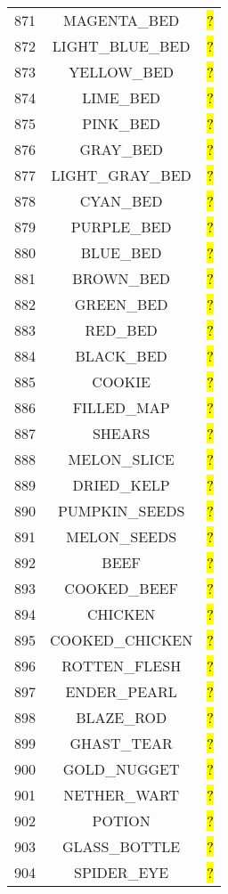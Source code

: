 \documentclass[11pt]{article}
\newcommand\myworries[1]{\sethlcolor{red}\hl{#1}}
\begin{document}
\begin{longtable}{ |c|c|c| }
871 & MAGENTA\_BED & \myworries{?} \\
872 & LIGHT\_BLUE\_BED & \myworries{?} \\
873 & YELLOW\_BED & \myworries{?} \\
874 & LIME\_BED & \myworries{?} \\
875 & PINK\_BED & \myworries{?} \\
876 & GRAY\_BED & \myworries{?} \\
877 & LIGHT\_GRAY\_BED & \myworries{?} \\
878 & CYAN\_BED & \myworries{?} \\
879 & PURPLE\_BED & \myworries{?} \\
880 & BLUE\_BED & \myworries{?} \\
881 & BROWN\_BED & \myworries{?} \\
882 & GREEN\_BED & \myworries{?} \\
883 & RED\_BED & \myworries{?} \\
884 & BLACK\_BED & \myworries{?} \\
885 & COOKIE & \myworries{?} \\
886 & FILLED\_MAP & \myworries{?} \\
887 & SHEARS & \myworries{?} \\
888 & MELON\_SLICE & \myworries{?} \\
889 & DRIED\_KELP & \myworries{?} \\
890 & PUMPKIN\_SEEDS & \myworries{?} \\
891 & MELON\_SEEDS & \myworries{?} \\
892 & BEEF & \myworries{?} \\
893 & COOKED\_BEEF & \myworries{?} \\
894 & CHICKEN & \myworries{?} \\
895 & COOKED\_CHICKEN & \myworries{?} \\
896 & ROTTEN\_FLESH & \myworries{?} \\
897 & ENDER\_PEARL & \myworries{?} \\
898 & BLAZE\_ROD & \myworries{?} \\
899 & GHAST\_TEAR & \myworries{?} \\
900 & GOLD\_NUGGET & \myworries{?} \\
901 & NETHER\_WART & \myworries{?} \\
902 & POTION & \myworries{?} \\
903 & GLASS\_BOTTLE & \myworries{?} \\
904 & SPIDER\_EYE & \myworries{?} \\

\end{longtable}
\end{document}
